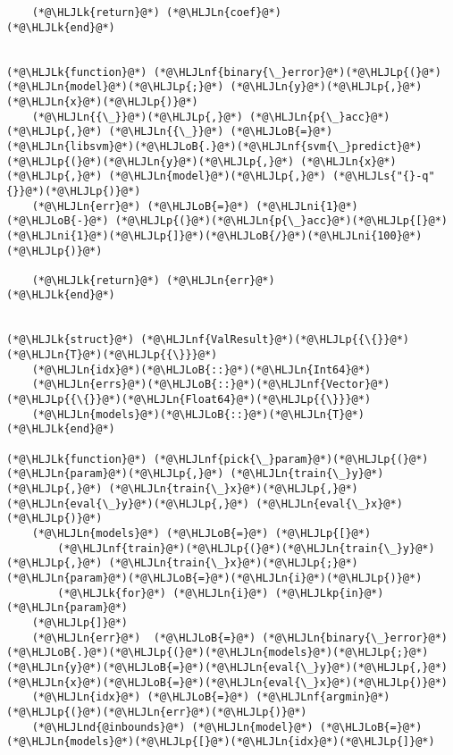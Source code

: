 \documentclass[12pt,a4paper]{article}
\newcommand{\HLJLk}[1]{\textcolor[RGB]{148,91,176}{\textbf{#1}}}
\newcommand{\HLJLkp}[1]{\textcolor[RGB]{148,91,176}{\textbf{#1}}}
\newcommand{\HLJLn}[1]{#1}
\newcommand{\HLJLnd}[1]{\textcolor[RGB]{214,102,97}{#1}}
\newcommand{\HLJLnf}[1]{\textcolor[RGB]{66,102,213}{#1}}
\newcommand{\HLJLs}[1]{\textcolor[RGB]{201,61,57}{#1}}
\newcommand{\HLJLni}[1]{\textcolor[RGB]{59,151,46}{#1}}
\newcommand{\HLJLoB}[1]{\textcolor[RGB]{102,102,102}{\textbf{#1}}}
\newcommand{\HLJLp}[1]{#1}
\begin{document}
\begin{lstlisting}
    (*@\HLJLk{return}@*) (*@\HLJLn{coef}@*)
(*@\HLJLk{end}@*)


(*@\HLJLk{function}@*) (*@\HLJLnf{binary{\_}error}@*)(*@\HLJLp{(}@*)(*@\HLJLn{model}@*)(*@\HLJLp{;}@*) (*@\HLJLn{y}@*)(*@\HLJLp{,}@*) (*@\HLJLn{x}@*)(*@\HLJLp{)}@*)
    (*@\HLJLn{{\_}}@*)(*@\HLJLp{,}@*) (*@\HLJLn{p{\_}acc}@*)(*@\HLJLp{,}@*) (*@\HLJLn{{\_}}@*) (*@\HLJLoB{=}@*) (*@\HLJLn{libsvm}@*)(*@\HLJLoB{.}@*)(*@\HLJLnf{svm{\_}predict}@*)(*@\HLJLp{(}@*)(*@\HLJLn{y}@*)(*@\HLJLp{,}@*) (*@\HLJLn{x}@*)(*@\HLJLp{,}@*) (*@\HLJLn{model}@*)(*@\HLJLp{,}@*) (*@\HLJLs{"{}-q"{}}@*)(*@\HLJLp{)}@*)
    (*@\HLJLn{err}@*) (*@\HLJLoB{=}@*) (*@\HLJLni{1}@*) (*@\HLJLoB{-}@*) (*@\HLJLp{(}@*)(*@\HLJLn{p{\_}acc}@*)(*@\HLJLp{[}@*)(*@\HLJLni{1}@*)(*@\HLJLp{]}@*)(*@\HLJLoB{/}@*)(*@\HLJLni{100}@*)(*@\HLJLp{)}@*)

    (*@\HLJLk{return}@*) (*@\HLJLn{err}@*)
(*@\HLJLk{end}@*)


(*@\HLJLk{struct}@*) (*@\HLJLnf{ValResult}@*)(*@\HLJLp{{\{}}@*)(*@\HLJLn{T}@*)(*@\HLJLp{{\}}}@*)
    (*@\HLJLn{idx}@*)(*@\HLJLoB{::}@*)(*@\HLJLn{Int64}@*)
    (*@\HLJLn{errs}@*)(*@\HLJLoB{::}@*)(*@\HLJLnf{Vector}@*)(*@\HLJLp{{\{}}@*)(*@\HLJLn{Float64}@*)(*@\HLJLp{{\}}}@*)
    (*@\HLJLn{models}@*)(*@\HLJLoB{::}@*)(*@\HLJLn{T}@*)
(*@\HLJLk{end}@*)

(*@\HLJLk{function}@*) (*@\HLJLnf{pick{\_}param}@*)(*@\HLJLp{(}@*)(*@\HLJLn{param}@*)(*@\HLJLp{,}@*) (*@\HLJLn{train{\_}y}@*)(*@\HLJLp{,}@*) (*@\HLJLn{train{\_}x}@*)(*@\HLJLp{,}@*) (*@\HLJLn{eval{\_}y}@*)(*@\HLJLp{,}@*) (*@\HLJLn{eval{\_}x}@*)(*@\HLJLp{)}@*)
    (*@\HLJLn{models}@*) (*@\HLJLoB{=}@*) (*@\HLJLp{[}@*)
        (*@\HLJLnf{train}@*)(*@\HLJLp{(}@*)(*@\HLJLn{train{\_}y}@*)(*@\HLJLp{,}@*) (*@\HLJLn{train{\_}x}@*)(*@\HLJLp{;}@*) (*@\HLJLn{param}@*)(*@\HLJLoB{=}@*)(*@\HLJLn{i}@*)(*@\HLJLp{)}@*)
        (*@\HLJLk{for}@*) (*@\HLJLn{i}@*) (*@\HLJLkp{in}@*) (*@\HLJLn{param}@*)
    (*@\HLJLp{]}@*)
    (*@\HLJLn{err}@*)  (*@\HLJLoB{=}@*) (*@\HLJLn{binary{\_}error}@*)(*@\HLJLoB{.}@*)(*@\HLJLp{(}@*)(*@\HLJLn{models}@*)(*@\HLJLp{;}@*) (*@\HLJLn{y}@*)(*@\HLJLoB{=}@*)(*@\HLJLn{eval{\_}y}@*)(*@\HLJLp{,}@*) (*@\HLJLn{x}@*)(*@\HLJLoB{=}@*)(*@\HLJLn{eval{\_}x}@*)(*@\HLJLp{)}@*)
    (*@\HLJLn{idx}@*) (*@\HLJLoB{=}@*) (*@\HLJLnf{argmin}@*)(*@\HLJLp{(}@*)(*@\HLJLn{err}@*)(*@\HLJLp{)}@*)
    (*@\HLJLnd{@inbounds}@*) (*@\HLJLn{model}@*) (*@\HLJLoB{=}@*) (*@\HLJLn{models}@*)(*@\HLJLp{[}@*)(*@\HLJLn{idx}@*)(*@\HLJLp{]}@*)


\end{lstlisting}
\end{document}
